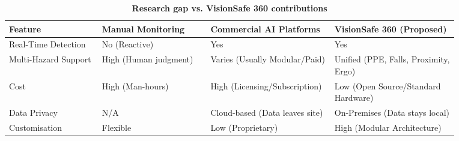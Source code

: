 \begin{table}[H]
\centering
\small
\renewcommand{\arraystretch}{1.2}
\begin{tabular}{|
>{\RaggedRight\arraybackslash}p{0.18\linewidth}|
>{\RaggedRight\arraybackslash}p{0.21\linewidth}|
>{\RaggedRight\arraybackslash}p{0.24\linewidth}|
>{\RaggedRight\arraybackslash}p{0.24\linewidth}|}
\hline
\textbf{Feature} & \textbf{Manual Monitoring} & \textbf{Commercial AI Platforms} & \textbf{VisionSafe 360 (Proposed)} \\
\hline
Real-Time Detection & No (Reactive) & Yes & Yes \\
\hline
Multi-Hazard Support & High (Human judgment) & Varies (Usually Modular/Paid) & Unified (PPE, Falls, Proximity, Ergo) \\
\hline
Cost & High (Man-hours) & High (Licensing/Subscription) & Low (Open Source/Standard Hardware) \\
\hline
Data Privacy & N/A & Cloud-based (Data leaves site) & On-Premises (Data stays local) \\
\hline
Customisation & Flexible & Low (Proprietary) & High (Modular Architecture) \\
\hline
\end{tabular}
\caption{\textbf{Research gap vs. VisionSafe 360 contributions}}
\end{table}
